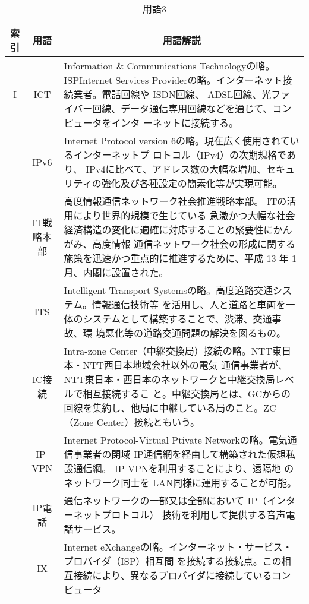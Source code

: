 \begin{table}[htb]
  \begin{center}
    \caption{用語3}
    \begin{tabular}{|c|c|p{10cm}|}
      \hline
      索引 & 用語 & \multicolumn{1}{c|}{用語解説} \\
      \hline
      I &  ICT & Information \& Communications Technologyの略。
      ISPInternet Services Providerの略。インターネット接続業者。電話回線や ISDN回線、
      ADSL回線、光ファイバー回線、データ通信専用回線などを通じて、コンピュータをインタ
      ーネットに接続する。 \\
      \cline{2-3}
      & IPv6 & Internet Protocol version 6の略。現在広く使用されているインターネットプ
      ロトコル（IPv4）の次期規格であり、 IPv4に比べて、アドレス数の大幅な増加、セキュ
      リティの強化及び各種設定の簡素化等が実現可能。 \\
      \cline{2-3}
      & IT戦略本部 & 
      高度情報通信ネットワーク社会推進戦略本部。 ITの活用により世界的規模で生じている
      急激かつ大幅な社会経済構造の変化に適確に対応することの緊要性にかんがみ、高度情報
      通信ネットワーク社会の形成に関する施策を迅速かつ重点的に推進するために、平成 13
      年 1月、内閣に設置された。\\
      \cline{2-3}
      & ITS & Intelligent Transport Systemsの略。高度道路交通システム。情報通信技術等
      を活用し、人と道路と車両を一体のシステムとして構築することで、渋滞、交通事故、環
      境悪化等の道路交通問題の解決を図るもの。 \\
      \cline{2-3}
      & IC接続 & 
      Intra-zone Center（中継交換局）接続の略。NTT東日本・NTT西日本地域会社以外の電気
      通信事業者が、 NTT東日本・西日本のネットワークと中継交換局レベルで相互接続するこ
      と。中継交換局とは、GCからの回線を集約し、他局に中継している局のこと。ZC（Zone
        Center）接続ともいう。\\
      \cline{2-3}
      & IP-VPN & Internet Protocol-Virtual Ptivate Networkの略。電気通信事業者の閉域
      IP通信網を経由して構築された仮想私設通信網。 IP-VPNを利用することにより、遠隔地
      のネットワーク同士を LAN同様に運用することが可能。 \\
      \cline{2-3}
      & IP電話 & 通信ネットワークの一部又は全部において IP（インターネットプロトコル）
      技術を利用して提供する音声電話サービス。 \\
      \cline{2-3}
      & IX & Internet eXchangeの略。インターネット・サービス・プロバイダ（ISP）相互間
      を接続する接続点。この相互接続により、異なるプロバイダに接続しているコンピュータ

\end{tabular}
\end{center}
\end{table}
